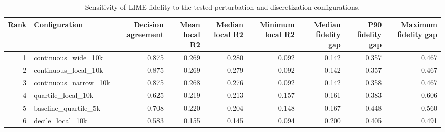 \begin{table}
\caption{Sensitivity of LIME fidelity to the tested perturbation and discretization configurations.}
\label{tab:lime_configuration_sensitivity}
\begin{tabular}{rlrrrrrrr}
\toprule
Rank & Configuration & Decision agreement & Mean local R2 & Median local R2 & Minimum local R2 & Median fidelity gap & P90 fidelity gap & Maximum fidelity gap \\
\midrule
1 & continuous_wide_10k & 0.875 & 0.269 & 0.280 & 0.092 & 0.142 & 0.357 & 0.467 \\
2 & continuous_local_10k & 0.875 & 0.269 & 0.279 & 0.092 & 0.142 & 0.357 & 0.467 \\
3 & continuous_narrow_10k & 0.875 & 0.268 & 0.276 & 0.092 & 0.142 & 0.358 & 0.467 \\
4 & quartile_local_10k & 0.625 & 0.219 & 0.213 & 0.157 & 0.161 & 0.383 & 0.606 \\
5 & baseline_quartile_5k & 0.708 & 0.220 & 0.204 & 0.148 & 0.167 & 0.448 & 0.560 \\
6 & decile_local_10k & 0.583 & 0.155 & 0.145 & 0.094 & 0.200 & 0.405 & 0.491 \\
\bottomrule
\end{tabular}
\end{table}
